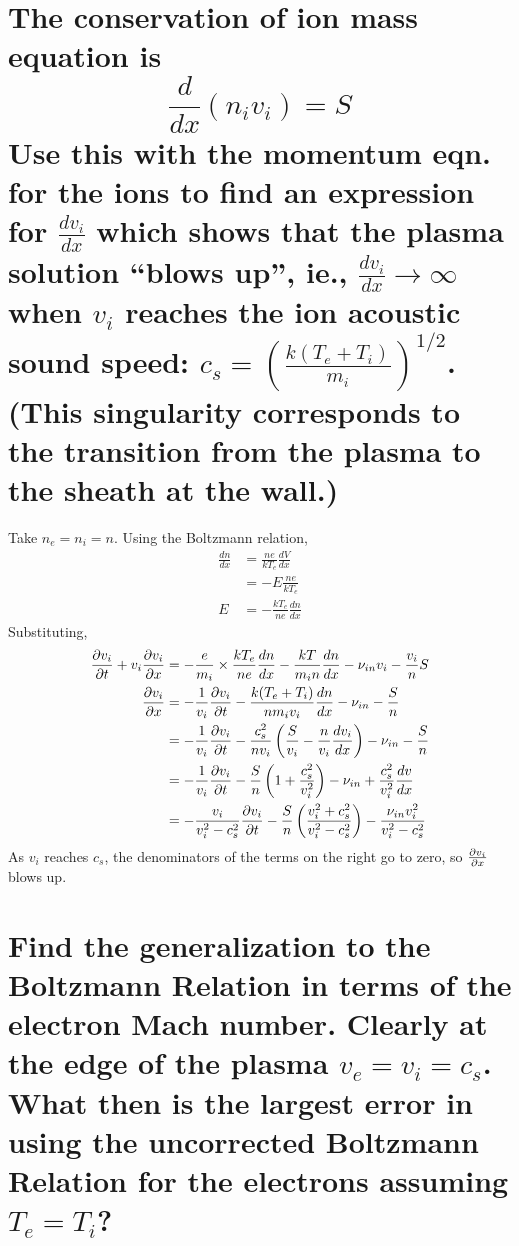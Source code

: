 \documentclass[answers]{exam}
\begin{document}
\begin{questions}
\begin{parts}
\part{The conservation of ion mass equation is
$$\frac{d}{dx}(n_iv_i) = S$$
Use this with the momentum eqn. for the ions to find an expression for $\frac{dv_i}{dx}$ which shows that the plasma solution “blows up”, ie., $\frac{dv_i}{dx} \rightarrow \infty$ when $v_i$ reaches the ion acoustic sound speed: $c_s = \left(\frac{k(T_e + T_i)}{m_i}\right)^{1/2}$. (This singularity corresponds to the transition from the plasma to the sheath at the wall.)}

\begin{solution}
    Take $n_e = n_i = n$. Using the Boltzmann relation,
    \begin{align*}
        \frac{dn}{dx} &= \frac{ne}{kT_e} \frac{dV}{dx} \\
                      &= -E \frac{ne}{kT_e} \\
        E &= -\frac{kT_e}{ne} \frac{dn}{dx}
    \end{align*}
    Substituting,
    \begin{align*}
        \frac{\partial v_i}{\partial t} + v_i\frac{\partial v_i}{\partial x} &= -\frac{e}{m_i} \times \frac{kT_e}{ne} \frac{dn}{dx} - \frac{kT}{m_in} \frac{dn}{dx} - \nu_{in}v_i - \frac{v_i}{n} S \\
        \frac{\partial v_i}{\partial x} &= -\frac{1}{v_i} \frac{\partial v_i}{\partial t} - \frac{k(T_e+T_i)}{nm_iv_i} \frac{dn}{dx} - \nu_{in} - \frac{S}{n} \\
                     &= -\frac{1}{v_i} \frac{\partial v_i}{\partial t} - \frac{c_s^2}{nv_i} \left(\frac{S}{v_i} - \frac{n}{v_i} \frac{dv_i}{dx}\right) - \nu_{in} - \frac{S}{n} \\
                     &= -\frac{1}{v_i} \frac{\partial v_i}{\partial t} - \frac{S}{n} \left(1 + \frac{c_s^2}{v_i^2}\right) - \nu_{in} + \frac{c_s^2}{v_i^2} \frac{dv}{dx} \\
                     &= -\frac{v_i}{v_i^2-c_s^2} \frac{\partial v_i}{\partial t} - \frac{S}{n} \left(\frac{v_i^2+c_s^2}{v_i^2-c_s^2}\right) - \frac{\nu_{in}v_i^2}{v_i^2-c_s^2}
    \end{align*}
    As $v_i$ reaches $c_s$, the denominators of the terms on the right go to zero, so $\frac{\partial v_i}{\partial x}$ blows up.
\end{solution}

\part{Find the generalization to the Boltzmann Relation in terms of the electron Mach number. Clearly at the edge of the plasma $v_e = v_i = c_s$. What then is the largest error in using the uncorrected Boltzmann Relation for the electrons assuming $T_e = T_i$?}


\end{parts}
\end{questions}
\end{document}
